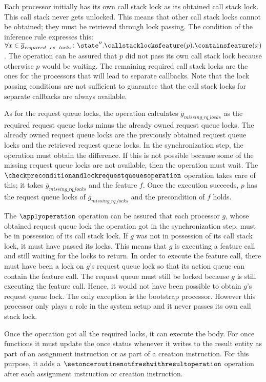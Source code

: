 Each processor initially has its own call stack lock as its obtained call stack lock. This call stack never gets unlocked. This means that other call stack locks cannot be obtained; they must be retrieved through lock passing. The condition of the inference rule expresses this: $\forall x \in \overline{g}_{required\_cs\_locks} \colon \state''.\callstacklocksfeature(p).\containsfeature(x)$. The operation can be assured that $p$ did not pass its own call stack lock because otherwise $p$ would be waiting. The remaining required call stack locks are the ones for the processors that will lead to separate callbacks. Note that the lock passing conditions are not sufficient to guarantee that the call stack locks for separate callbacks are always available.

As for the request queue locks, the operation calculates $\overline{g}_{missing\_rq\_ locks}$ as the required request queue locks minus the already owned request queue locks. The already owned request queue locks are the previously obtained request queue locks and the retrieved request queue locks. In the synchronization step, the operation must obtain the difference. If this is not possible because some of the missing request queue locks are not available, then the operation must wait. The $\checkpreconditionandlockrequestqueuesoperation$ operation takes care of this; it takes $\overline{g}_{missing\_rq\_ locks}$ and the feature $f$. Once the execution succeeds, $p$ has the request queue locks of $\overline{g}_{missing\_rq\_ locks}$ and the precondition of $f$ holds.

The $\applyoperation$ operation can be assured that each processor $g$, whose obtained request queue lock the operation got in the synchronization step, must be in possession of its call stack lock. If $g$ was not in possession of its call stack lock, it must have passed its locks. This means that $g$ is executing a feature call and still waiting for the locks to return. In order to execute the feature call, there must have been a lock on $g$'s request queue lock so that its action queue can contain the feature call. The request queue must still be locked because $g$ is still executing the feature call. Hence, it would not have been possible to obtain $g$'s request queue lock. The only exception is the bootstrap processor. However this processor only plays a role in the system setup and it never passes its own call stack lock.

Once the operation got all the required locks, it can execute the body. For once functions it must update the once status whenever it writes to the result entity as part of an assignment instruction or as part of a creation instruction. For this purpose, it adds a $\setonceroutinenotfreshwithresultoperation$ operation after each assignment instruction or creation instruction.

